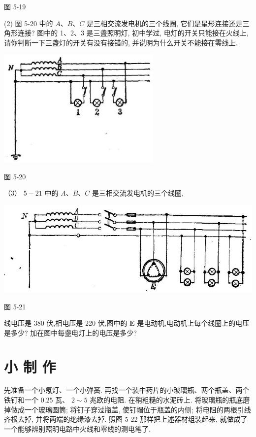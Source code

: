 \documentclass[10pt]{article}
\begin{document}
图 5-19

(2) 图 5-20 中的 \(A\text{、}B\text{、}C\) 是三相交流发电机的三个线圈, 它们是星形连接还是三角形连接? 图中的 1、2、3 是三盏照明灯, 初中学过, 电灯的开关只能接在火线上, 请你判断一下三盏灯的开关有没有接错的, 并说明为什么开关不能接在零线上.

\begin{center}
\includegraphics[max width=0.6\textwidth]{images/01913056-1f15-74d8-9184-9aab52c9d66b_178_977481.jpg}
\end{center}

图 5-20

（3） \(5 - {21}\) 中的 \(A\text{、}B\text{、}C\) 是三相交流发电机的三个线圈,

\begin{center}
\includegraphics[max width=1.0\textwidth]{images/01913056-1f15-74d8-9184-9aab52c9d66b_179_461014.jpg}
\end{center}

图 5-21

线电压是 380 伏,相电压是 220 伏,图中的 \(\mathbf{E}\) 是电动机,电动机上每个线圈上的电压是多少? 加在图中每盏电灯上的电压是多少?

\section*{小 制 作}

先准备一个小氖灯、一个小弹簧. 再找一个装中药片的小玻璃瓶、两个瓶盖、两个铁钉和一个 \({0.25}\) 瓦、 \(2 \sim 5\) 兆欧的电阻. 在稍粗糙的水泥砖上. 将玻璃瓶的瓶底磨掉做成一个玻璃圆筒; 将钉子穿过瓶盖, 使钉帽位于瓶盖的内侧; 将电阻的两根引线齐根去掉, 并将两端的绝缘漆去掉. 照图 5-22 那样把上述器材组装起来, 就做成了一个能够辨别照明电路中火线和零线的测电笔了.
\end{document}
